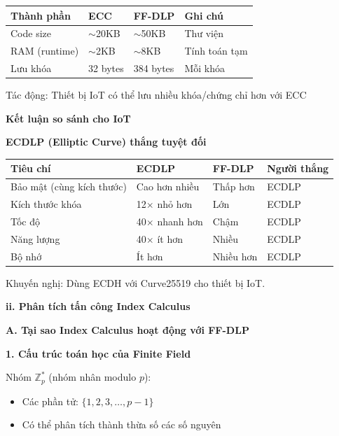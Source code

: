 \begin{center}
\begin{tabular}{|p{3cm}|p{3cm}|p{3cm}|p{3cm}|}
\hline
\textbf{Thành phần} & \textbf{ECC} & \textbf{FF-DLP} & \textbf{Ghi chú} \\
\hline
Code size & $\sim$20KB & $\sim$50KB & Thư viện \\
RAM (runtime) & $\sim$2KB & $\sim$8KB & Tính toán tạm \\
Lưu khóa & 32 bytes & 384 bytes & Mỗi khóa \\
\hline
\end{tabular}
\end{center}

Tác động: Thiết bị IoT có thể lưu nhiều khóa/chứng chỉ hơn với ECC

\textbf{Kết luận so sánh cho IoT}

\textbf{ECDLP (Elliptic Curve) thắng tuyệt đối}

\begin{center}
\begin{tabular}{|p{4cm}|p{3cm}|p{3cm}|p{2.5cm}|}
\hline
\textbf{Tiêu chí} & \textbf{ECDLP} & \textbf{FF-DLP} & \textbf{Người thắng} \\
\hline
Bảo mật (cùng kích thước) & Cao hơn nhiều & Thấp hơn & ECDLP \\
Kích thước khóa & 12$\times$ nhỏ hơn & Lớn & ECDLP \\
Tốc độ & 40$\times$ nhanh hơn & Chậm & ECDLP \\
Năng lượng & 40$\times$ ít hơn & Nhiều & ECDLP \\
Bộ nhớ & Ít hơn & Nhiều hơn & ECDLP \\
\hline
\end{tabular}
\end{center}

Khuyến nghị: Dùng ECDH với Curve25519 cho thiết bị IoT.

\vspace{0.2cm}


\textbf{ii. Phân tích tấn công Index Calculus}

\textbf{A. Tại sao Index Calculus hoạt động với FF-DLP}

\textbf{1. Cấu trúc toán học của Finite Field}

Nhóm $\mathbb{Z}_p^*$ (nhóm nhân modulo $p$):
\begin{itemize}
    \item Các phần tử: $\{1, 2, 3, \ldots, p-1\}$
    \item Có thể phân tích thành thừa số các số nguyên
\end{itemize}

